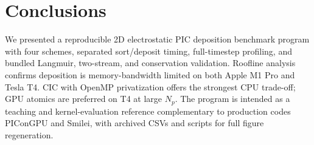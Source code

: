 \section{Conclusions}
\label{sec:conclusions}

We presented a reproducible 2D electrostatic PIC deposition benchmark program with four schemes, separated sort/deposit timing, full-timestep profiling, and bundled Langmuir, two-stream, and conservation validation.
Roofline analysis confirms deposition is memory-bandwidth limited on both Apple M1 Pro and Tesla T4.
CIC with OpenMP privatization offers the strongest CPU trade-off; GPU atomics are preferred on T4 at large $N_p$.
The program is intended as a teaching and kernel-evaluation reference complementary to production codes PIConGPU and Smilei, with archived CSVs and scripts for full figure regeneration.
